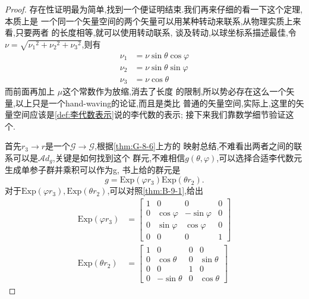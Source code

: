\documentclass[../main.tex]{subfiles}
\begin{document}
\begin{proof}
  存在性证明最为简单,找到一个便证明结束.我们再来仔细的看一下这个定理,本质上是
  一个同一个矢量空间的两个矢量可以用某种转动来联系,从物理实质上来看,只要两者
  的长度相等,就可以使用转动联系, 谈及转动,以球坐标系描述最佳,令$ \nu = \sqrt{\nu_{1}{}^{2} + \nu _{2}{}^{2} + \nu _{3}{}^{2}}$,则有
\begin{align*}
  \nu_1 &= \nu\sin\theta \cos\varphi \\
  \nu_2 &= \nu\sin\theta \sin\varphi\\
  \nu_3 &= \nu \cos \theta
\end{align*}
  而前面再加上 $\mu$这个常数作为放缩,消去了长度
  的限制,所以势必存在这么一个矢量,以上只是一个hand-waving的论证,而且是类比
  普通的矢量空间,实际上,这里的矢量空间应该是\ref{def:李代数表示}说的李代数的表示;
  接下来我们靠数学细节验证这个.

  首先$r_3 \to r$是一个$\mathscr{G} \to \mathscr{G}$,根据\ref{thm:G-8-6}上方的
  映射总结,不难看出两者之间的联系可以是$\mathscr{A}\!d_{g}$,关键是如何找到这个
  群元,不难相信$g(\theta,\varphi)$,可以选择合适李代数元生成单参子群并乘积可以作为g,
  书上给的群元是 \[
  g = \text{Exp}(\varphi r_3) \text{Exp}(\theta r_2)
  .\] 
  对于$\text{Exp}(\varphi r_3) ,\text{Exp}(\theta r_2)$,可以对照\ref{thm:B-9-1},给出
  \begin{align*}
    \text{Exp}(\varphi r_3) &= \begin{bmatrix} 1 & 0 & 0 &0\\ 0 & \cos \varphi & -\sin \varphi & 0 \\
    0 & \sin \varphi & \cos \varphi & 0 \\ 0&0&0& 1\end{bmatrix} \\
    \text{Exp}(\theta r_2) & = \begin{bmatrix}  1 & 0&0&0\\ 0 & \cos \theta & 0 &\sin \theta\\
        0&0&1&0 \\ 0 & -\sin \theta & 0 & \cos \theta
      \end{bmatrix} 
  \end{align*}


\end{proof}
\end{document}
